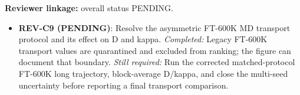 \textbf{Reviewer linkage:} overall status PENDING.
\begin{itemize}[leftmargin=1.4em,noitemsep]
\item \textbf{REV-C9 (PENDING)}: Resolve the asymmetric FT-600K MD transport protocol and its effect on D and kappa. \emph{Completed:} Legacy FT-600K transport values are quarantined and excluded from ranking; the figure can document that boundary. \emph{Still required:} Run the corrected matched-protocol FT-600K long trajectory, block-average D/kappa, and close the multi-seed uncertainty before reporting a final transport comparison.
\end{itemize}
